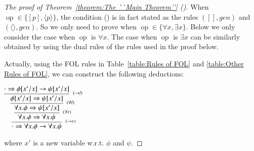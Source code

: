 \documentclass{fcs}
\newcommand{\la}[0]{\langle}
\newcommand{\ra}[0]{\rangle}
\newcommand{\rmn}[1]{(\romannumeral#1)}
\begin{document}
\begin{proof}[The proof of Theorem~\ref{theorem:The ``Main Theorem''} \rmn{3}]
    When $\mathop{op}\in \{[p], \la p\ra\}$, the condition \rmn{3} is in fact stated as the rules $([], \mathit{gen})$ and $(\la\ra, \mathit{gen})$.
    So we only need to prove when $\mathop{op}\in \{\forall x, \exists x\}$.
    Below we only consider the case when $\mathop{op}$ is $\forall x$. The case when $\mathop{op}$ is $\exists x$ can be similarly obtained by using the dual rules of the rules used in the proof below.

Actually, using the FOL rules in Table~\ref{table:Rules of FOL} and \ref{table:Other Rules of FOL}, we can construct the following deductions:
\begin{center}
$\infer[^{(\to r)}]
    {\cdot\Rightarrow \forall x.\phi\to \forall x.\psi}
    {\infer[^{(\forall r)}]
        {\forall x.\phi\Rightarrow \forall x.\psi}
        {\infer[^{(\forall l)}]
            {\forall x.\phi\Rightarrow \psi[x'/x]}
            {\infer[^{(\to l)}]
                {\phi[x'/x]\Rightarrow \psi[x'/x]}
                {\cdot\Rightarrow \phi[x'/x]\to \psi[x'/x]}
            }
        }
    }
$
\end{center}
where $x'$ is a new variable w.r.t. $\phi$ and $\psi$.
\end{proof}
\end{document}
